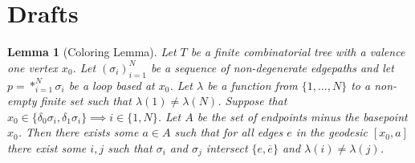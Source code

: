 \documentclass{article}
\theoremstyle{mystyle}
\newtheorem{lem}{Lemma}[section]
\theoremstyle{remark}
\begin{document}
\newpage
\section{Drafts}
\begin{lem}%
	[Coloring Lemma]
	Let \(T\) be a finite combinatorial tree with a valence one vertex \(x_{0}\). Let \((\sigma_{i} )_{i=1}^{N}\) be a sequence of non-degenerate edgepaths and let \(p = *_{i=1}^{N} \sigma_{i}\) be a loop based at \(x_{0}\). Let \(\lambda\) be a function from \(\{1,\ldots,N\}\) to a non-empty finite set such that \(\lambda (1) \neq \lambda (N)\). Suppose that \(x_{0} \in \{\delta_{0} \sigma_{i} , \delta_{1} \sigma_{i} \} \implies i \in \{1,N\}\). Let \(A\) be the set of endpoints minus the basepoint \(x_{ 0}\). Then there exists some \(a \in A\) such that for all edges \(e\) in the geodesic \([x_{0} , a]\) there exist some \(i, j\) such that \(\sigma_{i}\) and \(\sigma_{j}\) intersect \(\{e,\overline{e}\}\) and \(\lambda ( i ) \neq \lambda ( j )\).

\end{lem}%
\end{document}
